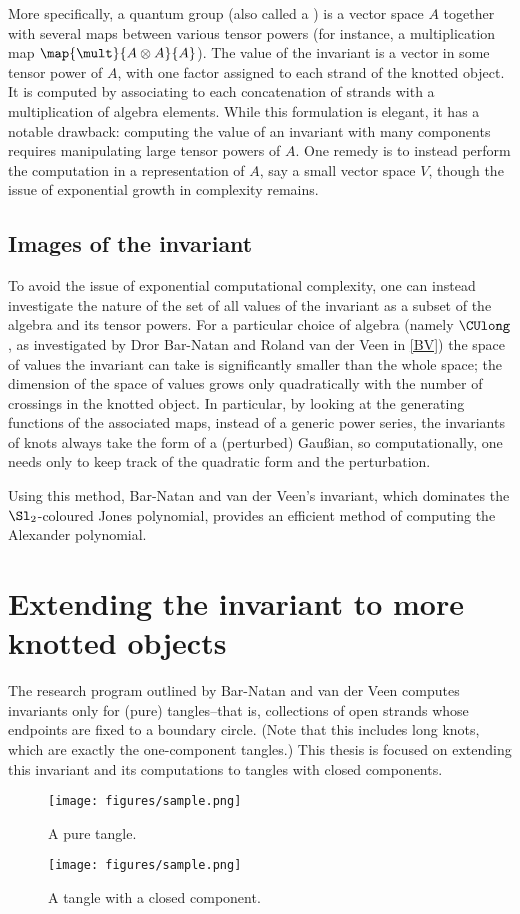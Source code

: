 More specifically, a quantum group (also called a ) is a
vector space $A$ together with several maps between various tensor powers (for
instance, a multiplication map $\map {\mult} {A \otimes A} {A}$). The value of
the invariant is a vector in some tensor power of $A$, with one factor assigned
to each strand of the knotted object. It is computed by associating to each
concatenation of strands with a multiplication of algebra elements. While this
formulation is elegant, it has a notable drawback: computing the value of an
invariant with many components requires manipulating large tensor powers of $A$.
One remedy is to instead perform the computation in a representation of $A$, say
a small vector space $V$, though the issue of exponential growth in complexity
remains.

\subsection{Images of the invariant}
To avoid the issue of exponential computational complexity, one can instead
investigate the nature of the set of all values of the invariant as a subset of
the algebra and its tensor powers. For a particular choice of algebra (namely
$\CUlong$, as investigated by Dror Bar-Natan and Roland van der Veen in
\cref{BV}) the space of values the invariant can take is significantly smaller
than the whole space; the dimension of the space of values grows only
quadratically with the number of crossings in the knotted object. In particular,
by looking at the generating functions of the associated maps, instead of a
generic power series, the invariants of knots always take the form of a
(perturbed) Gaußian, so computationally, one needs only to keep track of the
quadratic form and the perturbation.

Using this method, Bar-Natan and van der Veen's invariant, which dominates the
$\Sl_2$-coloured Jones polynomial, provides an efficient method of computing the
Alexander polynomial.

\section{Extending the invariant to more knotted objects}
The research program outlined by Bar-Natan and van der Veen computes invariants
only for (pure) tangles--that is, collections of open strands whose endpoints
are fixed to a boundary circle. (Note that this includes long knots, which are
exactly the one-component tangles.) This thesis is focused on extending this
invariant and its computations to tangles with closed components.
\begin{figure}[h]
        \centering
        \texttt{[image: figures/sample.png]}%
        \caption{A pure tangle.}
        \label{fig:pure_tangle}
\end{figure}
\begin{figure}[h]
        \centering
        \texttt{[image: figures/sample.png]}%
        \caption{A tangle with a closed component.}
        \label{fig:impure_tangle}
\end{figure}        

